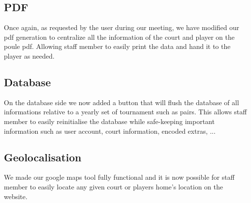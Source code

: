 \subsection{PDF}

Once again, as requested by the user during our meeting, we have modified our pdf generation to centralize all the information of the court and player on the poule pdf. Allowing staff member to easily print the data and hand it to the player as needed.

\subsection{Database}

On the database side we now added a button that will flush the database of all informations relative to a yearly set of tournament such as pairs. This allows staff member to easily reinitialise the database while safe-keeping important information such as user account, court information, encoded extras, ...

\subsection{Geolocalisation}

We made our google maps tool fully functional and it is now possible for staff member to easily locate any given court or players home's location on the website.